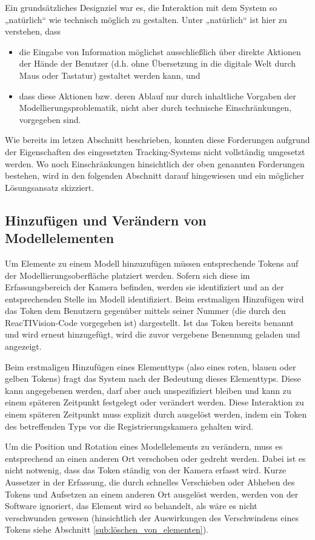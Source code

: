 Ein grundsätzliches Designziel war es, die Interaktion mit dem System so „natürlich“ wie technisch möglich zu gestalten. Unter „natürlich“ ist hier zu verstehen, dass 
\begin{itemize}
	\item die Eingabe von Information möglichst ausschließlich über direkte Aktionen der Hände der Benutzer (d.h. ohne Übersetzung in die digitale Welt durch Maus oder Tastatur) gestaltet werden kann, und
	\item dass diese Aktionen bzw. deren Ablauf nur durch inhaltliche Vorgaben der Modellierungsproblematik, nicht aber durch technische Einschränkungen, vorgegeben sind.
\end{itemize}
Wie bereits im letzen Abschnitt beschrieben, konnten diese Forderungen aufgrund der Eigenschaften des eingesetzten Tracking-Systems nicht vollständig umgesetzt werden. Wo noch Einschränkungen hinsichtlich der oben genannten Forderungen bestehen, wird in den folgenden Abschnitt darauf hingewiesen und ein möglicher Lösungsansatz skizziert.

\subsection{Hinzufügen und Verändern von Modellelementen} %
\label{sub:hinzufügen_und_verändern_von_modellelementen}

Um Elemente zu einem Modell hinzuzufügen müssen entsprechende Tokens auf der Modellierungsoberfläche platziert werden. Sofern sich diese im Erfassungsbereich der Kamera befinden, werden sie identifiziert und an der entsprechenden Stelle im Modell identifiziert. Beim erstmaligen Hinzufügen wird das Token dem Benutzern gegenüber mittels seiner Nummer (die durch den ReacTIVision-Code vorgegeben ist) dargestellt. Ist das Token bereits benannt und wird erneut hinzugefügt, wird die zuvor vergebene Benennung geladen und angezeigt.

Beim erstmaligen Hinzufügen eines Elementtyps (also eines roten, blauen oder gelben Tokens) fragt das System nach der Bedeutung dieses Elementtyps. Diese kann angegebenen werden, darf aber auch unspezifiziert bleiben und kann zu einem späteren Zeitpunkt festgelegt oder verändert werden. Diese Interaktion zu einem späteren Zeitpunkt muss explizit durch ausgelöst werden, indem ein Token des betreffenden Typs vor die Registrierungskamera gehalten wird.

Um die Position und Rotation eines Modellelements zu verändern, muss es entsprechend an einen anderen Ort verschoben oder gedreht werden. Dabei ist es nicht notwenig, dass das Token ständig von der Kamera erfasst wird. Kurze Aussetzer in der Erfassung, die durch schnelles Verschieben oder Abheben des Tokens und Aufsetzen an einem anderen Ort ausgelöst werden, werden von der Software ignoriert, das Element wird so behandelt, als wäre es nicht verschwunden gewesen (hinsichtlich der Auswirkungen des Verschwindens eines Tokens siehe Abschnitt \ref{sub:löschen_von_elementen}).

